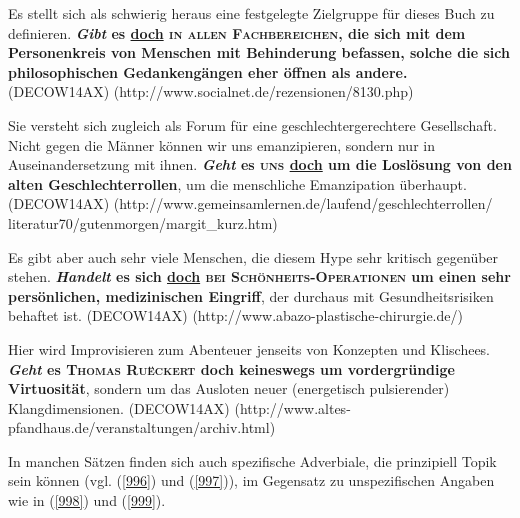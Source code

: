 {\begin{exe}
	\ex\label{991} 
	\scriptsize
	Es stellt sich als schwierig heraus eine festgelegte Zielgruppe für dieses Buch zu definieren. \textbf{\textit{Gibt} es \underline{doch} \textsc{in 		allen Fachbereichen}, die sich mit dem Personenkreis von Menschen mit Behinderung befassen, solche die sich philosophischen Gedankengängen eher öffnen 		als andere.}
	\hfill\hbox {(DECOW14AX)}
	\newline
	\hbox{}\hfill\hbox{(http://www.socialnet.de/rezensionen/8130.php)}
\end{exe}

\begin{exe}
	\ex\label{992} 
	\scriptsize
	Sie versteht sich zugleich als Forum für eine geschlechtergerechtere Gesellschaft. \glqq Nicht gegen die Männer können wir uns emanzipieren, sondern 		nur in Auseinandersetzung mit ihnen. \textbf{\textit{Geht} es \textsc{uns} \underline{doch} um die Loslösung von den alten Geschlechterrollen}, um die 		menschliche Emanzipation überhaupt.	\grqq{} 	
	\hfill\hbox {(DECOW14AX)}
	\newline
	\hbox{}\hfill\hbox{(http://www.gemeinsamlernen.de/laufend/geschlechterrollen/}
	\newline
	\hbox{}\hfill\hbox{literatur70/gutenmorgen/margit\_kurz.htm)}
\end{exe}

\begin{exe}
	\ex\label{993} 
	\scriptsize
	Es gibt aber auch sehr viele Menschen, die diesem Hype sehr kritisch gegenüber stehen. \textbf{\textit{Handelt} es sich \underline{doch} \textsc{bei 		Schönheits-Operationen} um einen sehr persönlichen, medizinischen Eingriff}, der durchaus mit Gesundheitsrisiken behaftet ist.  		
	\hfill\hbox {(DECOW14AX)}
	\newline
	\hbox{}\hfill\hbox{(http://www.abazo-plastische-chirurgie.de/)}
\end{exe}							               
						                			                      
\begin{exe}
	\ex\label{995} 
	\scriptsize
	Hier wird Improvisieren zum Abenteuer jenseits von Konzepten und Klischees. \textbf{\textit{Geht} es \textsc{Thomas Ruëckert} doch keineswegs um 			vordergründige Virtuosität}, sondern um das Ausloten neuer (energetisch pulsierender) Klangdimensionen.		 		
	\hfill\hbox {(DECOW14AX)}
	\newline
	\hbox{}\hfill\hbox{(http://www.altes-pfandhaus.de/veranstaltungen/archiv.html)}
\end{exe}								                       						  	
In manchen Sätzen finden sich auch spezifische Adverbiale, die prinzipiell Topik sein können (vgl. (\ref{996}) und (\ref{997})), im Gegensatz zu unspezifischen Angaben wie in (\ref{998}) und (\ref{999}).

}
